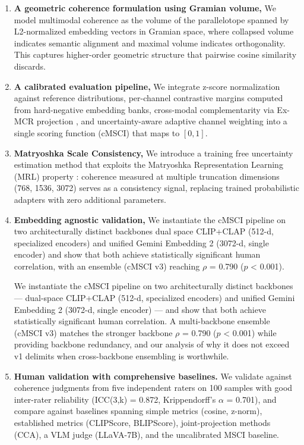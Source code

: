 \documentclass[a4paper,fleqn]{cas-sc}
\begin{document}
\begin{enumerate}
\item \textbf{A geometric coherence formulation using Gramian volume,} We model multimodal coherence as the volume of the parallelotope spanned by L2-normalized embedding vectors in Gramian space, where collapsed volume indicates semantic alignment and maximal volume indicates orthogonality. This captures higher-order geometric structure that pairwise cosine similarity discards.

\item \textbf{A calibrated evaluation pipeline,} We integrate z-score normalization against reference distributions, per-channel contrastive margins computed from hard-negative embedding banks, cross-modal complementarity via Ex-MCR projection \citep{wang2023exmcr}, and uncertainty-aware adaptive channel weighting into a single scoring function (cMSCI) that maps to $[0, 1]$.

\item \textbf{Matryoshka Scale Consistency,} We introduce a training free uncertainty estimation method that exploits the Matryoshka Representation Learning (MRL) property \citep{kusupati2022matryoshka}: coherence measured at multiple truncation dimensions (768, 1536, 3072) serves as a consistency signal, replacing trained probabilistic adapters with zero additional parameters.

\item \textbf{Embedding agnostic validation,} We instantiate the cMSCI pipeline on two architecturally distinct backbones dual space CLIP+CLAP (512-d, specialized encoders) and unified Gemini Embedding 2 (3072-d, single encoder) and show that both achieve statistically significant human correlation, with an ensemble (cMSCI v3) reaching $\rho$ = 0.790 ($p$ < 0.001).

We instantiate the cMSCI pipeline on two architecturally distinct backbones — dual-space CLIP+CLAP (512-d, specialized encoders) and unified Gemini Embedding 2 (3072-d, single encoder) — and show that both achieve statistically significant human correlation. A multi-backbone ensemble (cMSCI v3) matches the stronger backbone $\rho$ = 0.790 ($p$ < 0.001) while providing backbone redundancy, and our analysis of why it does not exceed v1 delimits when cross-backbone ensembling is worthwhile.

\item \textbf{Human validation with comprehensive baselines.} We validate against coherence judgments from five independent raters on 100 samples with good inter-rater reliability (ICC(3,k) = 0.872, Krippendorff's $\alpha$ = 0.701), and compare against baselines spanning simple metrics (cosine, z-norm), established metrics (CLIPScore, BLIPScore), joint-projection methods (CCA), a VLM judge (LLaVA-7B), and the uncalibrated MSCI baseline.


\end{enumerate}
\end{document}
